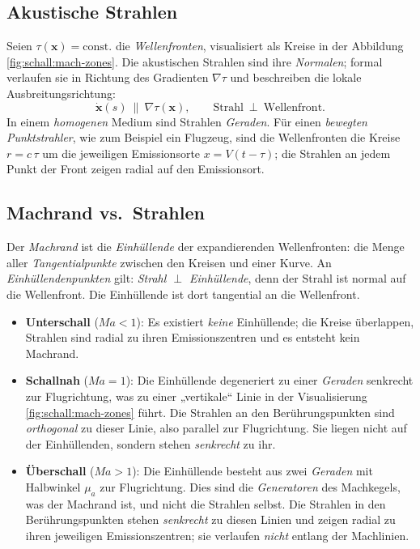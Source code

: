 \subsection*{Akustische Strahlen}
Seien $\tau(\mathbf{x})=\mathrm{const.}$ die \emph{Wellenfronten}, visualisiert
als Kreise in der Abbildung \ref{fig:schall:mach-zones}.
Die akustischen Strahlen sind ihre \emph{Normalen}; formal verlaufen sie
in Richtung des Gradienten $\nabla\tau$ und beschreiben die lokale
Ausbreitungsrichtung:
\[
    \dot{\mathbf{x}}(s)\ \parallel\ \nabla\tau(\mathbf{x}),\qquad
    \text{Strahl}\ \perp\ \text{Wellenfront}.
\]
In einem \emph{homogenen} Medium sind Strahlen \emph{Geraden}.
Für einen \emph{bewegten Punktstrahler}, wie zum Beispiel ein Flugzeug,
sind die Wellenfronten die Kreise $r=c\,\tau$ um die jeweiligen Emissionsorte
$x=V(t-\tau)$; die Strahlen an jedem Punkt der Front zeigen radial auf den Emissionsort.

\subsection*{Machrand vs.\ Strahlen}
Der \emph{Machrand} ist die \emph{Einhüllende} der expandierenden Wellenfronten:
die Menge aller \emph{Tangentialpunkte} zwischen den Kreisen und einer Kurve.
An \emph{Einhüllendenpunkten} gilt: \emph{Strahl $\perp$ Einhüllende},
denn der Strahl ist normal auf die Wellenfront.
Die Einhüllende ist dort tangential an die Wellenfront.

\begin{itemize}
\item \textbf{Unterschall} ($\textit{Ma}<1$):
Es existiert \emph{keine} Einhüllende; die Kreise überlappen, Strahlen
sind radial zu ihren Emissionszentren und es entsteht kein Machrand.

\item \textbf{Schallnah} ($\textit{Ma}=1$):
Die Einhüllende degeneriert zu einer \emph{Geraden} senkrecht zur Flugrichtung,
was zu einer „vertikale“ Linie in der Visualisierung \ref{fig:schall:mach-zones} führt.
Die Strahlen an den Berührungspunkten sind \emph{orthogonal} zu dieser Linie,
also parallel zur Flugrichtung.
Sie liegen nicht auf der Einhüllenden, sondern stehen \emph{senkrecht} zu ihr.

\item \textbf{Überschall} ($\textit{Ma}>1$):
Die Einhüllende besteht aus zwei \emph{Geraden} mit Halbwinkel $\mu_a$ zur Flugrichtung.
Dies sind die \emph{Generatoren} des Machkegels, was der Machrand ist,
und nicht die Strahlen selbst.
Die Strahlen in den Berührungspunkten stehen \emph{senkrecht} zu
diesen Linien und zeigen radial zu ihren jeweiligen Emissionszentren;
sie verlaufen \emph{nicht} entlang der Machlinien.
\end{itemize}

